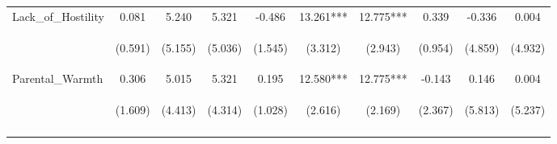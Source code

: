 \begin{tabular}{lccccccccc}
\noalign{\smallskip}Lack_of_Hostility & 0.081 & 5.240 & 5.321 & -0.486 & 13.261*** & 12.775*** & 0.339 & -0.336 & 0.004\\
 & \begin{footnotesize}(0.591)\end{footnotesize} & \begin{footnotesize}(5.155)\end{footnotesize} & \begin{footnotesize}(5.036)\end{footnotesize} & \begin{footnotesize}(1.545)\end{footnotesize} & \begin{footnotesize}(3.312)\end{footnotesize} & \begin{footnotesize}(2.943)\end{footnotesize} & \begin{footnotesize}(0.954)\end{footnotesize} & \begin{footnotesize}(4.859)\end{footnotesize} & \begin{footnotesize}(4.932)\end{footnotesize}\\
\noalign{\smallskip}Parental_Warmth & 0.306 & 5.015 & 5.321 & 0.195 & 12.580*** & 12.775*** & -0.143 & 0.146 & 0.004\\
 & \begin{footnotesize}(1.609)\end{footnotesize} & \begin{footnotesize}(4.413)\end{footnotesize} & \begin{footnotesize}(4.314)\end{footnotesize} & \begin{footnotesize}(1.028)\end{footnotesize} & \begin{footnotesize}(2.616)\end{footnotesize} & \begin{footnotesize}(2.169)\end{footnotesize} & \begin{footnotesize}(2.367)\end{footnotesize} & \begin{footnotesize}(5.813)\end{footnotesize} & \begin{footnotesize}(5.237)\end{footnotesize}\\
\noalign{\smallskip}\hline\end{tabular}\\
